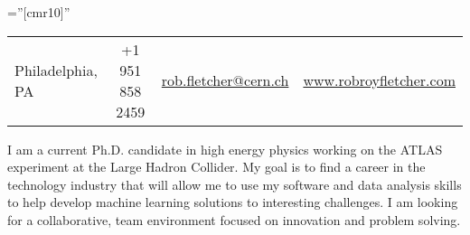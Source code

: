 \documentclass[a4paper,10pt]{article} %
\begin{document}
\pagestyle{empty} %

\font\fb=''[cmr10]'' %


\par{\bigskip\par} %
\begin{centering}
\begin{tabular}{ l | c | c | r}
Philadelphia, PA   &  +1 951 858 2459   &   \href{mailto:rob.fletcher@cern.ch}{rob.fletcher@cern.ch} & \href{www.robroyfletcher.com}{www.robroyfletcher.com}
\end{tabular} \par
\end{centering}

\vspace{5mm}
I am a current Ph.D. candidate in high energy physics working on the ATLAS experiment at the Large Hadron
Collider. My goal is to find a career in the technology industry that will allow me to use my software
and data analysis skills to help develop machine learning solutions to interesting challenges. I am looking
for a collaborative, team environment focused on innovation and problem solving.
\vspace{3mm}





\end{document}
